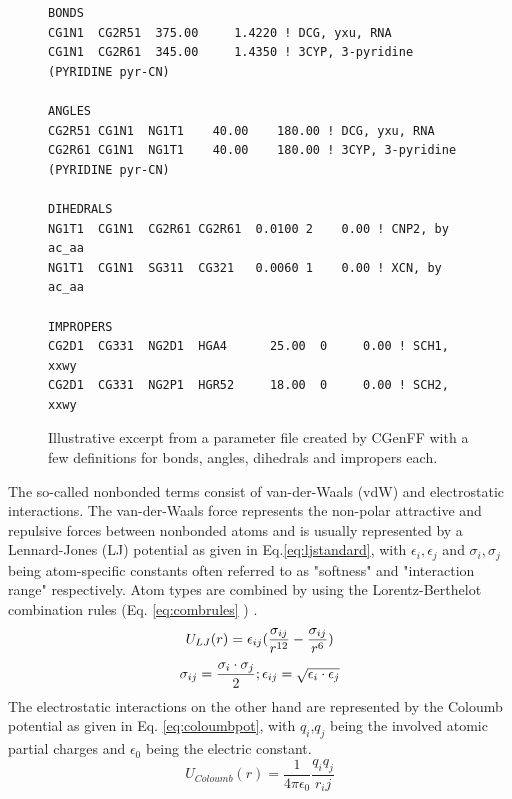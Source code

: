 \documentclass[oneside]{scrreprt}
\begin{document}
\begin{figure}
\small
\begin{verbatim}
BONDS
CG1N1  CG2R51  375.00     1.4220 ! DCG, yxu, RNA
CG1N1  CG2R61  345.00     1.4350 ! 3CYP, 3-pyridine (PYRIDINE pyr-CN)

ANGLES
CG2R51 CG1N1  NG1T1    40.00    180.00 ! DCG, yxu, RNA
CG2R61 CG1N1  NG1T1    40.00    180.00 ! 3CYP, 3-pyridine (PYRIDINE pyr-CN)

DIHEDRALS
NG1T1  CG1N1  CG2R61 CG2R61  0.0100 2    0.00 ! CNP2, by ac_aa
NG1T1  CG1N1  SG311  CG321   0.0060 1    0.00 ! XCN, by ac_aa

IMPROPERS
CG2D1  CG331  NG2D1  HGA4      25.00  0     0.00 ! SCH1, xxwy
CG2D1  CG331  NG2P1  HGR52     18.00  0     0.00 ! SCH2, xxwy

\end{verbatim}
   \caption{Illustrative excerpt from a parameter file created by CGenFF with a few definitions for bonds, angles, dihedrals and impropers each.}
    \label{fig:parmfile}
\end{figure}






The so-called nonbonded terms consist of van-der-Waals (vdW) and electrostatic interactions.
The van-der-Waals force represents the non-polar attractive and repulsive forces between nonbonded atoms and is usually represented by a Lennard-Jones (LJ) potential as given in Eq.\ref{eq:ljstandard}, with $\epsilon_i, \epsilon_j$ and $\sigma_i, \sigma_j$ being atom-specific constants often referred to as "softness" and "interaction range" respectively. Atom types are combined by using the Lorentz-Berthelot combination rules (Eq. \ref{eq:combrules} \cite{orabiCorrectionsCHARMM36Parametrization2021,jensen_introduction_2017}) .
\begin{equation}
U_{LJ}(r)=\epsilon_{ij}(\frac{\sigma_{ij}}{r^{12}} - \frac{\sigma_{ij}}{r^6}) \label{eq:ljstandard} \\
\end{equation}
\begin{equation}
\sigma_{ij}=\frac{\sigma_i\cdot \sigma_j}{2}; \epsilon_{ij}=\sqrt{\epsilon_i \cdot \epsilon_j} \label{eq:combrules} \\
\end{equation}
The electrostatic interactions on the other hand are represented by the Coloumb potential as given in Eq. \ref{eq:coloumbpot}, with $q_i$,$q_j$ being the involved atomic partial charges and $\epsilon_0$ being the electric constant.
\begin{equation}\label{eq:coloumbpot}
    U_{Coloumb}(r)=\frac{1}{4 \pi \epsilon_0}\frac{q_i q_j}{r_ij}
\end{equation}
\end{document}
